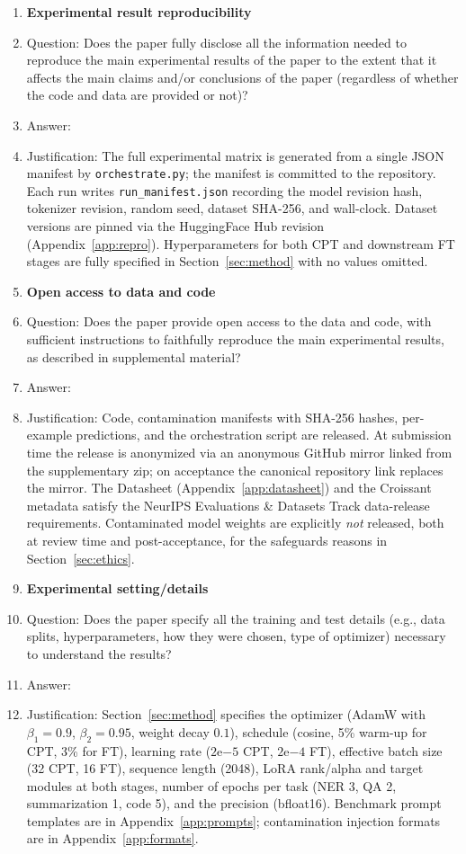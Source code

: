 \begin{enumerate}
    \item {\bf Experimental result reproducibility}
    \item[] Question: Does the paper fully disclose all the information needed to reproduce the main experimental results of the paper to the extent that it affects the main claims and/or conclusions of the paper (regardless of whether the code and data are provided or not)?
    \item[] Answer: \answerYes{}
    \item[] Justification: The full experimental matrix is generated from a single JSON manifest by \texttt{orchestrate.py}; the manifest is committed to the repository. Each run writes \texttt{run\_manifest.json} recording the model revision hash, tokenizer revision, random seed, dataset SHA-256, and wall-clock. Dataset versions are pinned via the HuggingFace Hub revision (Appendix~\ref{app:repro}). Hyperparameters for both CPT and downstream FT stages are fully specified in Section~\ref{sec:method} with no values omitted.

\item {\bf Open access to data and code}
    \item[] Question: Does the paper provide open access to the data and code, with sufficient instructions to faithfully reproduce the main experimental results, as described in supplemental material?
    \item[] Answer: \answerYes{}
    \item[] Justification: Code, contamination manifests with SHA-256 hashes, per-example predictions, and the orchestration script are released. At submission time the release is anonymized via an anonymous GitHub mirror linked from the supplementary zip; on acceptance the canonical repository link replaces the mirror. The Datasheet (Appendix~\ref{app:datasheet}) and the Croissant metadata satisfy the NeurIPS Evaluations \& Datasets Track data-release requirements. Contaminated model weights are explicitly \emph{not} released, both at review time and post-acceptance, for the safeguards reasons in Section~\ref{sec:ethics}.

\item {\bf Experimental setting/details}
    \item[] Question: Does the paper specify all the training and test details (e.g., data splits, hyperparameters, how they were chosen, type of optimizer) necessary to understand the results?
    \item[] Answer: \answerYes{}
    \item[] Justification: Section~\ref{sec:method} specifies the optimizer (AdamW with $\beta_1{=}0.9$, $\beta_2{=}0.95$, weight decay $0.1$), schedule (cosine, 5\% warm-up for CPT, 3\% for FT), learning rate ($2\mathrm{e}{-5}$ CPT, $2\mathrm{e}{-4}$ FT), effective batch size (32 CPT, 16 FT), sequence length (2048), LoRA rank/alpha and target modules at both stages, number of epochs per task (NER 3, QA 2, summarization 1, code 5), and the precision (bfloat16). Benchmark prompt templates are in Appendix~\ref{app:prompts}; contamination injection formats are in Appendix~\ref{app:formats}.


\end{enumerate}
